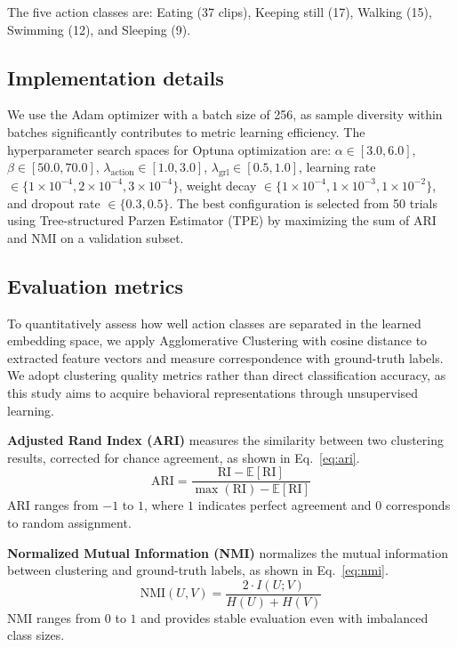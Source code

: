 \documentclass[twocolumn]{svjour3}
\begin{document}
The five action classes are: Eating (37 clips), Keeping still (17), Walking (15), Swimming (12), and Sleeping (9).

\subsection{Implementation details}

We use the Adam optimizer with a batch size of 256, as sample diversity within batches significantly contributes to metric learning efficiency.
The hyperparameter search spaces for Optuna optimization are:
$\alpha \in [3.0, 6.0]$,
$\beta \in [50.0, 70.0]$,
$\lambda_{\mathrm{action}} \in [1.0, 3.0]$,
$\lambda_{\mathrm{grl}} \in [0.5, 1.0]$,
learning rate $\in \{1 \times 10^{-4}, 2 \times 10^{-4}, 3 \times 10^{-4}\}$,
weight decay $\in \{1 \times 10^{-4}, 1 \times 10^{-3}, 1 \times 10^{-2}\}$,
and dropout rate $\in \{0.3, 0.5\}$.
The best configuration is selected from 50 trials using Tree-structured Parzen Estimator (TPE) by maximizing the sum of ARI and NMI on a validation subset.

\subsection{Evaluation metrics}

To quantitatively assess how well action classes are separated in the learned embedding space, we apply Agglomerative Clustering with cosine distance to extracted feature vectors and measure correspondence with ground-truth labels.
We adopt clustering quality metrics rather than direct classification accuracy, as this study aims to acquire behavioral representations through unsupervised learning.

\textbf{Adjusted Rand Index (ARI)} measures the similarity between two clustering results, corrected for chance agreement, as shown in Eq.~\eqref{eq:ari}.
\begin{equation}
  \mathrm{ARI} = \frac{\mathrm{RI} - \mathbb{E}[\mathrm{RI}]}{\max(\mathrm{RI}) - \mathbb{E}[\mathrm{RI}]}
  \label{eq:ari}
\end{equation}
ARI ranges from $-1$ to $1$, where $1$ indicates perfect agreement and $0$ corresponds to random assignment.

\textbf{Normalized Mutual Information (NMI)} normalizes the mutual information between clustering and ground-truth labels, as shown in Eq.~\eqref{eq:nmi}.
\begin{equation}
  \mathrm{NMI}(U, V) = \frac{2 \cdot I(U; V)}{H(U) + H(V)}
  \label{eq:nmi}
\end{equation}
NMI ranges from $0$ to $1$ and provides stable evaluation even with imbalanced class sizes.
\end{document}
